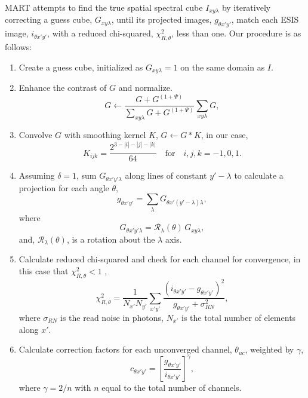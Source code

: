 	MART attempts to find the true spatial spectral cube $I_{xy\lambda}$ by iteratively correcting a guess cube, $G_{xy\lambda}$, until its projected images, $g_{\theta x'y'}$, match each ESIS image, $i_{\theta x'y'}$, with a reduced chi-squared, $\chi_{R,\theta}^2$,  less than one.
	Our procedure is as follows:
	\begin{enumerate}
		\item \label{step:guess} Create a guess cube,
		initialized as 
		$G_{xy\lambda} = 1$ on the same domain as $I$. 
		\item \label{step:contrast} Enhance the contrast of $G$ and normalize. 
			\begin{equation}
				G \leftarrow \frac{G+G^{(1+\Psi)}}{\sum_{xy\lambda}G+G^{(1+\Psi)}}\sum_{xy\lambda}G, 
			\end{equation}
		
		\item \label{step:smooth} Convolve $G$ with smoothing kernel $K$, $G \leftarrow G * K$,
		in our case,
			\begin{equation}
			\label{eq:kernel}
				K_{ijk} = \frac{2^{3-|i|-|j|-|k|}}{64} \quad \text{for}\quad i,j,k = -1,0,1.
			\end{equation}
		\item \label{step:project} Assuming $\delta=1$, sum $G_{\theta x'y'\lambda}$ along lines of constant $y'-\lambda$ to calculate a projection for each angle $\theta$,
			\begin{equation}
				g_{\theta x'y'} = \sum_\lambda G_{\theta x'(y'-\lambda)\lambda}, 
			\end{equation}
		where
			\begin{equation}
				G_{\theta x'y'\lambda} = \mathcal{R}_\lambda(\theta)\,G_{xy\lambda},
			\end{equation} 
		and, $\mathcal{R}_\lambda (\theta)$, is a rotation about the $\lambda$ axis. 	
		
		\item \label{step:chisquared} Calculate reduced chi-squared and check for each channel for convergence, in this case that $\chi_{R,\theta}^2 < 1$ , 
			\begin{equation}
				\chi_{R,\theta}^2 = \frac{1}{N_{x'} N_{y'}}\sum_{x'y'} \frac{(i_{\theta x'y'}-g_{\theta x'y'})^2}{g_{\theta x'y'}+\sigma^2_{RN}},
			\end{equation}
		where $\sigma_{RN}$ is the read noise in photons, $N_{x'}$ is the total number of elements along $x'$.
		
		\item Calculate correction factors for each unconverged channel, $\theta_{uc}$, weighted by $\gamma$, 
			\begin{equation} \label{eq:correctionfactor}
				c_{\theta x'y'} = \left[\frac{g_{\theta x'y'}}{i_{\theta x'y'}}\right]^\gamma,
			\end{equation}
		where $\gamma = 2/n$ with $n$ equal to the total number of channels.
		

\end{enumerate}
